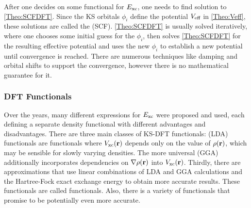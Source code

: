After one decides on some functional for $E_{\text{xc}}$, one needs to find  solution
to \eqref{Theo:SCFDFT}. Since the KS orbitals $\phi_i$ define the potential $V_{\text{eff}}$ in
\eqref{Theo:Veff}, these solutions are called the  (SCF). 
\eqref{Theo:SCFDFT} is usually solved iteratively, where one chooses some initial guess
for the $\phi_i$, then solves \eqref{Theo:SCFDFT} for the resulting effective potential
and uses the new $\phi_i$ to establish a new potential until convergence is reached.
There are numerous techniques like damping and orbital shifts to support the
convergence, however there is no mathematical guarantee for it. 


\subsubsection{DFT Functionals}
\label{Sec:Theo:Functionals}
Over the years, many different expressions for $E_{\text{xc}}$ were proposed and used, each
defining a separate density functional with different advantages and disadvantages. There
are three main classes of KS-DFT functionals:  (LDA) functionals
are functionals where $V_{\text{xc}}(\mathbf{r})$ depends only on the value of $\rho(\mathbf{r})$,
which may be sensible for slowly varying densities. The more universal  (GGA) additionally incorporates dependencies on $\nabla\rho(\mathbf{r})$ into $V_{\text{xc}}(\mathbf{r})$. Thirdly,
there are approximations that use linear combinations of LDA and GGA calculations and the
Hartree-Fock exact exchange energy to obtain more accurate results.\cite{Becke1993}
These functionals are called  functionals. Also, there is a variety
of  functionals that promise to be potentially even more
accurate.

